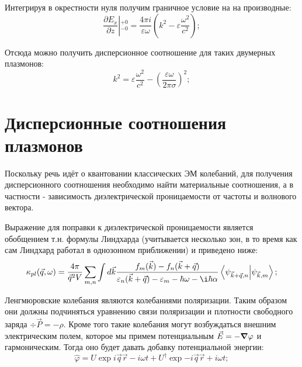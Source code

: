 \documentclass[../main.tex]{subfiles}
\begin{document}
    Интегрируя в окрестности нуля получим граничное условие на на производные:
    \begin{equation*}
        \left.\frac{\partial E_x}{\partial z}\right\vert{}^{+0}_{-0} = \frac{4\pi i}{\varepsilon \omega}
        \left(k^2  - \varepsilon \frac{\omega^2}{c^2}\right);
    \end{equation*}

    Отсюда можно получить дисперсионное соотношение для таких двумерных плазмонов:
    \begin{equation}
        \label{plasmons:disp}
        k^2  = \varepsilon  \frac{\omega^2}{c^2} - \left(\frac{\varepsilon\omega}{2\pi \sigma}\right)^2;
    \end{equation}
    
    \section{Дисперсионные соотношения плазмонов}

    Поскольку речь идёт о квантовании классических ЭМ колебаний, 
    для получения дисперсионного соотношения необходимо найти 
    материальные соотношения, а в частности - зависимость 
    диэлектрической проницаемости от частоты и волнового вектора.

    Выражение для поправки к диэлектрической проницаемости является 
    обобщением т.н. формулы Линдхарда (учитывается несколько зон, в то 
    время как сам Линдхард работал в однозонном приближении)
    и приведено ниже:
    \begin{equation}
        \label{lindhard}
        \kappa_{pl}(\vec q, \omega) = \frac{4\pi}{\vec{q}^2 V}
            \sum_{m, n} \int d\vec k \frac{f_m(\vec k) - f_n(\vec k 
                + \vec q)}{\varepsilon_n(\vec k + \vec q) - 
                \varepsilon_m - \hbar \omega - \i \hbar \alpha}
                \bra{\psi_{\vec k + \vec q,n}} \ket{\psi_{\vec k, m}};
    \end{equation}

    Ленгмюровские колебания являются колебаниями поляризации. Таким
    образом они должны подчиняться уравнению связи поляризации и 
    плотности свободного заряда $\div \vec P  = - \rho$. Кроме того 
    такие колебания могут возбуждаться внешним электрическим полем, 
    которое мы примем потенциальным $\vec E = - \grad \varphi$ и 
    гармоническим. Тогда оно будет давать добавку потенциальной энергии:
    \begin{equation}
        \label{plazmon:field}
        \hat \varphi  = U \exp{i\vec q \vec r - i \omega t}
            + U^{\dagger} \exp{-i\vec q\vec r + i \omega t};
    \end{equation}
\end{document}

